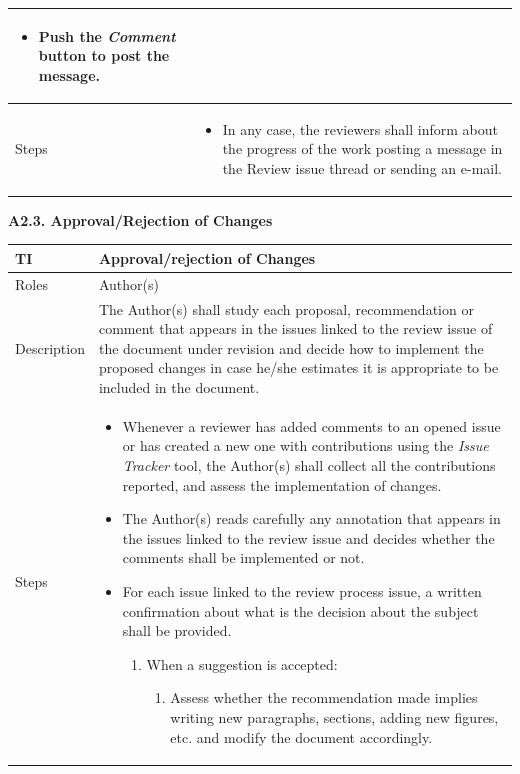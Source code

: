 \documentclass{template/openetcs_article}
\begin{document}
\begin{flushleft}
\begin{supertabular}{|m{2cm}|m{13cm}|}
\begin{enumerate}
\begin{itemize}
\item Push the {\it Comment} button to post the message.
\end{itemize}
\end{enumerate}
\\\hline
Steps &
\begin{itemize}
\item In any case, the reviewers shall inform about the progress of the work posting a message in the Review issue thread or sending an e-mail. 
\end{itemize}
\\\hline
\end{supertabular}
\end{flushleft}

\textbf{A2.3. Approval/Rejection of Changes}

\begin{flushleft}
\tablefirsthead{}
\tablehead{}
\tabletail{}
\tablelasttail{}
\begin{supertabular}{|m{2cm}|m{13cm}|}
\hline
{}
TI & 
Approval/rejection of Changes
\\\hline
Roles &
Author(s)
\\\hline
Description &
The Author(s) shall study each proposal, recommendation or comment that appears in the issues linked to the review issue of the document under revision and decide how to implement the proposed changes in case he/she estimates it is appropriate to be included in the document. 
\\\hline
Steps &
\begin{itemize}
\item Whenever a reviewer has added comments to an opened issue or has created a new one with contributions using the {\it Issue Tracker} tool, the Author(s) shall collect all the contributions reported, and assess the implementation of changes. 
\item The Author(s) reads carefully any annotation that appears in the issues linked to the review issue and decides whether the comments shall be implemented or not.
\item For each issue linked to the review process issue, a written confirmation about what is the decision about the subject shall be provided. 
\begin{enumerate}
\item When a suggestion is accepted:
\begin{enumerate}
\item Assess whether the recommendation made implies writing new paragraphs, sections, adding new figures, etc. and modify the document accordingly. 

\end{enumerate}
\end{enumerate}
\end{itemize}
\end{supertabular}
\end{flushleft}
\end{document}
